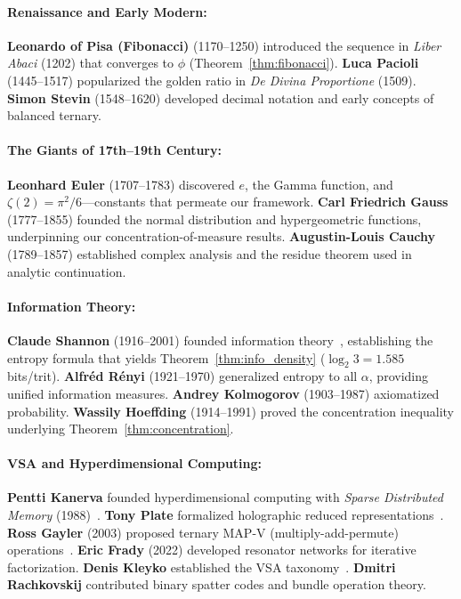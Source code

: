 \documentclass[aps,prd,preprint,superscriptaddress,showpacs,nofootinbib,longbibliography]{revtex4-2}
\begin{document}
\paragraph{Renaissance and Early Modern:}
\textbf{Leonardo of Pisa (Fibonacci)} (1170--1250) introduced the sequence in \textit{Liber Abaci} (1202) that converges to $\phi$ (Theorem~\ref{thm:fibonacci}). \textbf{Luca Pacioli} (1445--1517) popularized the golden ratio in \textit{De Divina Proportione} (1509). \textbf{Simon Stevin} (1548--1620) developed decimal notation and early concepts of balanced ternary.

\paragraph{The Giants of 17th--19th Century:}
\textbf{Leonhard Euler} (1707--1783) discovered $e$, the Gamma function, and $\zeta(2) = \pi^2/6$---constants that permeate our framework. \textbf{Carl Friedrich Gauss} (1777--1855) founded the normal distribution and hypergeometric functions, underpinning our concentration-of-measure results. \textbf{Augustin-Louis Cauchy} (1789--1857) established complex analysis and the residue theorem used in analytic continuation.

\paragraph{Information Theory:}
\textbf{Claude Shannon} (1916--2001) founded information theory~\cite{shannon1948}, establishing the entropy formula that yields Theorem~\ref{thm:info_density} ($\log_2 3 = 1.585$ bits/trit). \textbf{Alfr\'ed R\'enyi} (1921--1970) generalized entropy to all $\alpha$, providing unified information measures. \textbf{Andrey Kolmogorov} (1903--1987) axiomatized probability. \textbf{Wassily Hoeffding} (1914--1991) proved the concentration inequality underlying Theorem~\ref{thm:concentration}.

\paragraph{VSA and Hyperdimensional Computing:}
\textbf{Pentti Kanerva} founded hyperdimensional computing with \textit{Sparse Distributed Memory} (1988)~\cite{kanerva2009}. \textbf{Tony Plate} formalized holographic reduced representations~\cite{plate2003}. \textbf{Ross Gayler} (2003) proposed ternary MAP-V (multiply-add-permute) operations~\cite{kleyko2022}. \textbf{Eric Frady} (2022) developed resonator networks for iterative factorization. \textbf{Denis Kleyko} established the VSA taxonomy~\cite{kleyko2022}. \textbf{Dmitri Rachkovskij} contributed binary spatter codes and bundle operation theory.
\end{document}
